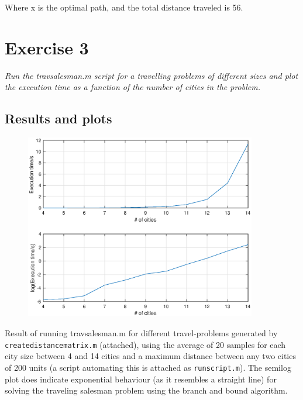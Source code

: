 \documentclass{article}
\begin{document}
  \noindent
  Where x is the optimal path, and the total distance traveled is 56.

  \newpage

\section*{Exercise 3}

  \textit{Run the travsalesman.m script for a travelling problems of different
  sizes and plot the execution time as a function of the number of cities in
  the problem.}

  \subsection*{Results and plots}

  \begin{figure}[!h]
    \centering
    \includegraphics[width=0.9\textwidth]{4_14_20samples.eps}
  \end{figure}

  \noindent
  Result of running travsalesman.m for different travel-problems generated by
  \texttt{createdistancematrix.m} (attached), using the average of 20 samples for each city
  size between 4 and 14 cities and a maximum distance between any two cities of 200 units
  (a script automating this is attached as \texttt{runscript.m}). The semilog plot does indicate exponential behaviour (as it
  resembles a straight line)
  for solving the traveling salesman problem using the branch and bound algorithm.
\end{document}

